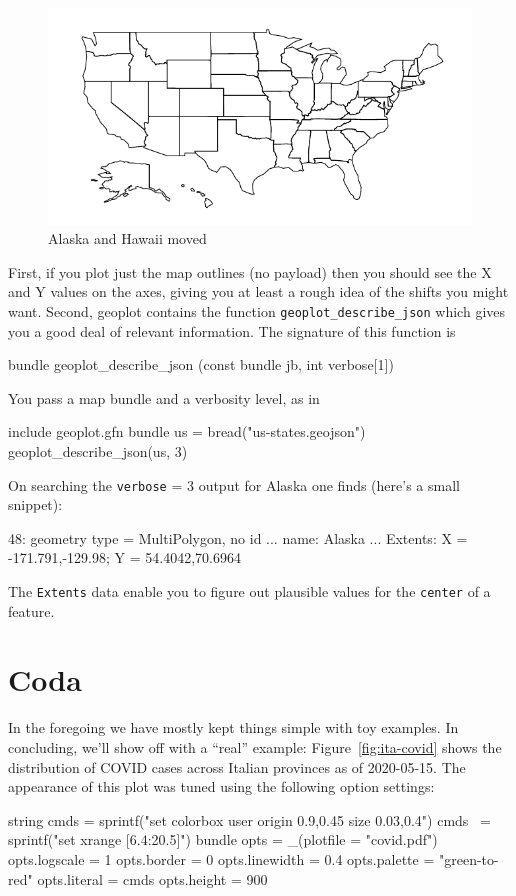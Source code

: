 \documentclass{article}
\begin{document}
\begin{figure}[p]
  \centering
  \includegraphics{usmod.pdf}
  \caption{Alaska and Hawaii moved}
  \label{fig:usmod}
\end{figure}

First, if you plot just the map outlines (no payload) then you should
see the X and Y values on the axes, giving you at least a rough idea
of the shifts you might want. Second, \textsf{geoplot} contains the
function \texttt{geoplot\_describe\_json} which gives you a good deal
of relevant information. The signature of this function is
\begin{code}
bundle geoplot_describe_json (const bundle jb, int verbose[1])
\end{code}
You pass a map bundle and a verbosity level, as in
\begin{code}
include geoplot.gfn
bundle us = bread("us-states.geojson")
geoplot_describe_json(us, 3)
\end{code}
On searching the \texttt{verbose} = 3 output for Alaska one finds
(here's a small snippet):
\begin{code}
  48: geometry type = MultiPolygon, no id
        ...
        name: Alaska
        ...
        Extents: X = {-171.791,-129.98}; Y = {54.4042,70.6964}
\end{code}
The \texttt{Extents} data enable you to figure out plausible
values for the \texttt{center} of a feature.

\section{Coda}

In the foregoing we have mostly kept things simple with toy
examples. In concluding, we'll show off with a ``real'' example:
Figure~\ref{fig:ita-covid} shows the distribution of COVID cases
across Italian provinces as of 2020-05-15. The appearance of this plot
was tuned using the following option settings:
\begin{code}
string cmds = sprintf("set colorbox user origin 0.9,0.45 size 0.03,0.4\n")
cmds ~= sprintf("set xrange [6.4:20.5]")
bundle opts = _(plotfile = "covid.pdf")
opts.logscale = 1
opts.border = 0
opts.linewidth = 0.4
opts.palette = "green-to-red"
opts.literal = cmds
opts.height = 900
\end{code}
\end{document}
